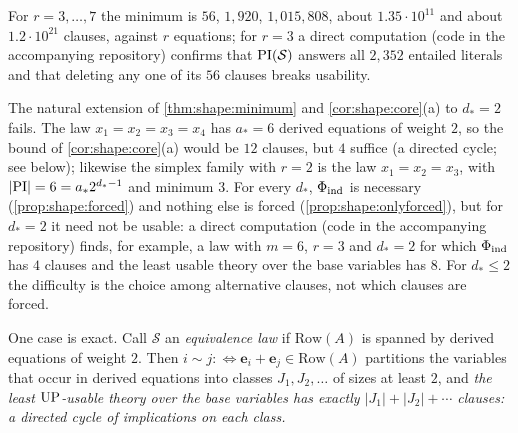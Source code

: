 For $r=3,\dots,7$ the minimum is $56$, $1{,}920$, $1{,}015{,}808$, about $1.35\cdot10^{11}$ and about $1.2\cdot10^{21}$ clauses, against $r$ equations; for $r=3$ a direct computation (code in the accompanying repository) confirms that $\mathrm{PI}(\mathcal S)$ answers all $2{,}352$ entailed literals and that deleting any one of its $56$ clauses breaks usability.

\begin{remark}\label{rem:shape:dstar2}
The natural extension of \cref{thm:shape:minimum} and \cref{cor:shape:core}(a) to $d_*=2$ fails. The law $x_1=x_2=x_3=x_4$ has $a_*=6$ derived equations of weight $2$, so the bound of \cref{cor:shape:core}(a) would be $12$ clauses, but $4$ suffice (a directed cycle; see below); likewise the simplex family with $r=2$ is the law $x_1=x_2=x_3$, with $\lvert\mathrm{PI}\rvert=6=a_*2^{d_*-1}$ and minimum $3$. For every $d_*$, $\Phi_{\rm ind}$ is necessary (\cref{prop:shape:forced}) and nothing else is forced (\cref{prop:shape:onlyforced}), but for $d_*=2$ it need not be usable: a direct computation (code in the accompanying repository) finds, for example, a law with $m=6$, $r=3$ and $d_*=2$ for which $\Phi_{\rm ind}$ has $4$ clauses and the least usable theory over the base variables has $8$. For $d_*\le2$ the difficulty is the choice among alternative clauses, not which clauses are forced.

One case is exact. Call $\mathcal S$ an \emph{equivalence law} if $\mathrm{Row}(A)$ is spanned by derived equations of weight $2$. Then $i\sim j:\iff\mathbf e_i+\mathbf e_j\in\mathrm{Row}(A)$ partitions the variables that occur in derived equations into classes $J_1,J_2,\dots$ of sizes at least $2$, and \emph{the least $\mathrm{UP}$-usable theory over the base variables has exactly $\lvert J_1\rvert+\lvert J_2\rvert+\cdots$ clauses: a directed cycle of implications on each class.}


\end{remark}

